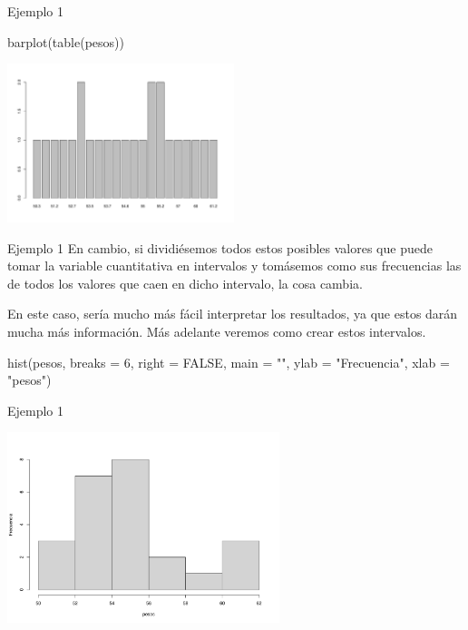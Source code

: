 \documentclass[
  ignorenonframetext,
  aspectratio=169]{beamer}
\newenvironment{Shaded}{\begin{snugshade}}{\end{snugshade}}
\newcommand{\AttributeTok}[1]{\textcolor[rgb]{0.77,0.63,0.00}{#1}}
\newcommand{\ConstantTok}[1]{\textcolor[rgb]{0.00,0.00,0.00}{#1}}
\newcommand{\DecValTok}[1]{\textcolor[rgb]{0.00,0.00,0.81}{#1}}
\newcommand{\FunctionTok}[1]{\textcolor[rgb]{0.00,0.00,0.00}{#1}}
\newcommand{\NormalTok}[1]{#1}
\newcommand{\StringTok}[1]{\textcolor[rgb]{0.31,0.60,0.02}{#1}}
\begin{document}
\begin{frame}[fragile]{Ejemplo 1}
\protect\hypertarget{ejemplo-1-1}{}
\begin{Shaded}
\begin{Highlighting}[]
\FunctionTok{barplot}\NormalTok{(}\FunctionTok{table}\NormalTok{(pesos))}
\end{Highlighting}
\end{Shaded}

\begin{center}\includegraphics[width=250px]{Hora6_files/figure-beamer/unnamed-chunk-3-1} \end{center}
\end{frame}

\begin{frame}[fragile]{Ejemplo 1}
\protect\hypertarget{ejemplo-1-2}{}
En cambio, si dividiésemos todos estos posibles valores que puede tomar
la variable cuantitativa en intervalos y tomásemos como sus frecuencias
las de todos los valores que caen en dicho intervalo, la cosa cambia.

En este caso, sería mucho más fácil interpretar los resultados, ya que
estos darán mucha más información. Más adelante veremos como crear estos
intervalos.

\begin{Shaded}
\begin{Highlighting}[]
\FunctionTok{hist}\NormalTok{(pesos, }\AttributeTok{breaks =} \DecValTok{6}\NormalTok{, }\AttributeTok{right =} \ConstantTok{FALSE}\NormalTok{, }\AttributeTok{main =} \StringTok{""}\NormalTok{, }\AttributeTok{ylab =} \StringTok{"Frecuencia"}\NormalTok{, }\AttributeTok{xlab =} \StringTok{"pesos"}\NormalTok{)}
\end{Highlighting}
\end{Shaded}
\end{frame}

\begin{frame}{Ejemplo 1}
\protect\hypertarget{ejemplo-1-3}{}
\begin{center}\includegraphics[width=300px]{Hora6_files/figure-beamer/unnamed-chunk-5-1} \end{center}
\end{frame}
\end{document}
